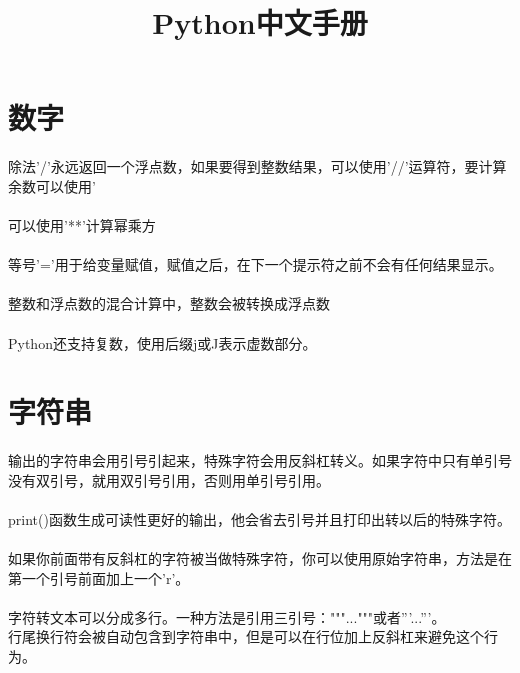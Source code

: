 \documentclass{article}
\begin{document}
\begin{CJK}{UTF8}{gbsn}
\title{Python中文手册}
\date{}
\maketitle
\section{数字}
\paragraph{}
除法'/'永远返回一个浮点数，如果要得到整数结果，可以使用'//'运算符，要计算余数可以使用'%
\paragraph{}
可以使用'**'计算幂乘方
\paragraph{}
等号'='用于给变量赋值，赋值之后，在下一个提示符之前不会有任何结果显示。
\paragraph{}
整数和浮点数的混合计算中，整数会被转换成浮点数
\paragraph{}
Python还支持复数，使用后缀j或J表示虚数部分。
\section{字符串}
\paragraph{}
输出的字符串会用引号引起来，特殊字符会用反斜杠转义。如果字符中只有单引号没有双引号，就用双引号引用，否则用单引号引用。
\paragraph{}
print()函数生成可读性更好的输出，他会省去引号并且打印出转以后的特殊字符。
\paragraph{}
如果你前面带有反斜杠的字符被当做特殊字符，你可以使用原始字符串，方法是在第一个引号前面加上一个'r'。
\paragraph{}
字符转文本可以分成多行。一种方法是引用三引号："""..."""或者'''...'''。
\\行尾换行符会被自动包含到字符串中，但是可以在行位加上反斜杠来避免这个行为。

\end{CJK}
\end{document}
